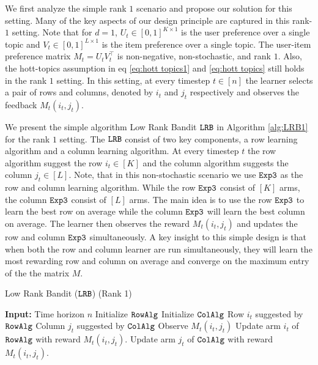 
We first analyze the simple rank $1$ scenario and propose our solution for this setting. Many of the key aspects of our design principle are captured in this rank-$1$ setting. Note that for $d=1$, $U_t\in [0,1]^{K\times 1}$ is the user preference over a single topic and $V_t \in [0,1]^{L\times 1}$ is the item preference over a single topic. The user-item preference matrix $M_t = U_tV_t^{\intercal}$ is non-negative, non-stochastic, and rank $1$. Also, the hott-topics assumption in eq \ref{eq:hott topics1} and \ref{eq:hott topics}  still holds in the rank $1$ setting.  In this setting, at every timestep $t\in[n]$ the learner selects a pair of rows and columns, denoted by $i_t$ and $j_t$ respectively and observes the feedback $M_t(i_t,j_t)$.

We present the simple algorithm Low Rank Bandit ${\tt LRB}$ in Algorithm \ref{alg:LRB1} for the rank $1$ setting. The ${\tt LRB}$ consist of two key components, a row learning algorithm and a column learning algorithm. At every timestep $t$  the row algorithm suggest the row $i_t\in [K]$ and the column algorithm suggests the column $j_t\in [L]$. Note, that in this non-stochastic scenario we use ${\tt Exp3}$ as the row and column learning algorithm. While the row ${\tt Exp3}$ consist of $[K]$ arms, the column ${\tt Exp3}$ consist of $[L]$ arms. The main idea is to use the row ${\tt Exp3}$ to learn the best row on average while the column ${\tt Exp3}$ will learn the best column on average. The learner then observes the reward $M_t(i_t, j_t)$ and updates the row and column ${\tt Exp3}$ simultaneously. A key insight to this simple design is that when both the row and column learner are run simultaneously, they will learn the most rewarding row and column on average and converge on the maximum entry of the the matrix $M$.


\begin{algorithm}[t]
  \caption{Low Rank Bandit (${\tt LRB}$) (Rank 1)}
  \label{alg:LRB1}
  \begin{algorithmic}[1]
    \State \textbf{Input:} Time horizon $n$
      \State Initialize ${\tt RowAlg} $
      \State Initialize ${\tt ColAlg} $
        \State Row $i_t$ suggested by ${\tt RowAlg}$
        \State Column $j_t$ suggested by ${\tt ColAlg}$
        \State Observe $M_t(i_t, j_t)$
    \State Update arm $i_t$ of ${\tt RowAlg}$ with reward $M_t(i_t, j_t)$.
    \State Update arm $j_t$ of ${\tt ColAlg}$ with reward $M_t(i_t, j_t)$.
     \EndFor
  \end{algorithmic}
\end{algorithm}
